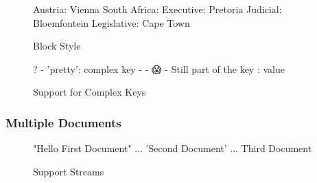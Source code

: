 \begin{figure}[H]
  \begin{minipage}[t]{0.48\textwidth}
    \vspace{0pt}
    \begin{bchart}[max=9, width=0.85\textwidth]
    \end{bchart}
  \end{minipage}
  \begin{minipage}[t]{0.48\textwidth}
    \vspace{0pt}
    \begin{yamlcode}
      Austria: Vienna
      South Africa:
        Executive:   Pretoria
        Judicial:    Bloemfontein
        Legislative: Cape Town
    \end{yamlcode}
  \end{minipage}
  \caption{Block Style}
\end{figure}

\begin{figure}[H]
  \begin{minipage}[t]{0.48\textwidth}
    \vspace{0pt}
    \begin{bchart}[max=9, width=0.85\textwidth]
    \end{bchart}
  \end{minipage}
  \begin{minipage}[t]{0.48\textwidth}
    \vspace{0pt}
    \begin{yamlcode}
      ?
      - { 'pretty': complex key }
      - - 😱
      - Still part of the key
      : value
    \end{yamlcode}
  \end{minipage}
  \caption{Support for Complex Keys}
\end{figure}

\subsubsection{Multiple Documents}

\begin{figure}[H]
  \begin{minipage}[t]{0.48\textwidth}
    \vspace{0pt}
    \begin{bchart}[max=9, width=0.85\textwidth]
    \end{bchart}
  \end{minipage}
  \begin{minipage}[t]{0.48\textwidth}
    \vspace{0pt}
    \begin{yamlcode}
      "Hello First Document"
      ...
      'Second Document'
      ...
      Third Document
    \end{yamlcode}
  \end{minipage}
  \caption{Support Streams}
\end{figure}

